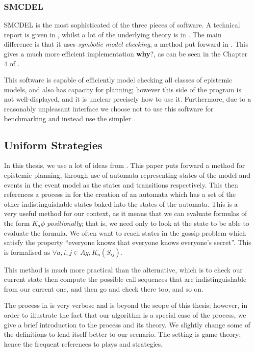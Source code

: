 \documentclass[12pt, a4paper]{article}
\begin{document}
\subsubsection{SMCDEL}

SMCDEL is the most sophisticated of the three pieces of software. A technical
report is given in \cite{SMCDEL}, whilst a lot of the underlying theory is in
\cite{MalvinThesis}. The main difference is that it uses \textit{symbolic model
  checking}, a method put forward in \cite{SymbolicModelChecking}. This gives a
much more efficient implementation \textbf{why}?, as can be seen in the
Chapter 4 of \cite{MalvinThesis}.

This software is capable of efficiently model checking all classes of epistemic
models, and also has capacity for planning; however this side of the program is
not well-displayed, and it is unclear precisely how to use it. Furthermore, due
to a reasonably unpleasant interface we choose not to use this software for
benchmarking and instead use the simpler \cite{GithubGossip}. 

\subsection{Uniform Strategies}

In this thesis, we use a lot of ideas from \cite{AutomataTechniques}. This paper
puts forward a method for epistemic planning, through use of automata
representing states of the model and events in the event model as the states and
transitions respectively. This then references a process in
\cite{UniformStrategies} for the creation of an automata which has a set of the
other indistinguishable states baked into the states of the automata. This is a
very useful method for our context, as it means that we can evaluate formulas of
the form $K_a \phi$ \textit{positionally}; that is, we need only to look at the
state to be able to evaluate the formula. We often want to reach states in the
gossip problem which satisfy the property ``everyone knows that everyone knows
everyone's secret''. This is formalised as $\forall a, i, j \in Ag, K_a (S
_{ij})$.

This method is much more practical than the alternative, which is to check our current
state then compute the possible call sequences that are indistinguishable from
our current one, and then go and check there too, and so on.

The process in \cite{UniformStrategies} is very verbose and is beyond the scope
of this thesis; however, in order to illustrate the fact that our algorithm is a
special case of the process, we give a brief introduction to the process and its
theory. We slightly change some of the definitions to lend itself better to our
scenario. The setting is game theory; hence the frequent references to plays and
strategies.
\end{document}
